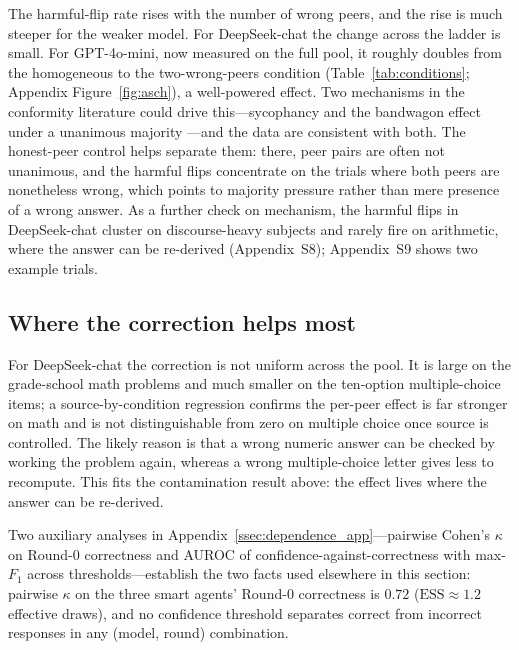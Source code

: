 \documentclass[11pt]{article}
\begin{document}
The harmful-flip rate rises with the number of wrong peers, and the rise is
much steeper for the weaker model.
For DeepSeek-chat the change across the ladder is small.
For GPT-4o-mini, now measured on the full pool, it roughly doubles from the
homogeneous to the two-wrong-peers condition (Table~\ref{tab:conditions};
Appendix Figure~\ref{fig:asch}), a well-powered effect.
Two mechanisms in the conformity literature could drive this---sycophancy
\citep{sharma2023towards} and the bandwagon effect under a unanimous
majority \citep{asch1951effects,koo2024benchmarking}---and the data are
consistent with both.
The honest-peer control helps separate them: there, peer pairs are often
not unanimous, and the harmful flips concentrate on the trials where both
peers are nonetheless wrong, which points to majority pressure rather than
mere presence of a wrong answer.
As a further check on mechanism, the harmful flips in DeepSeek-chat cluster
on discourse-heavy subjects and rarely fire on arithmetic, where the answer
can be re-derived (Appendix~S8); Appendix~S9 shows two example trials.


\subsection{Where the correction helps most}
\label{sub:crossmodel}

For DeepSeek-chat the correction is not uniform across the pool.
It is large on the grade-school math problems and much smaller on the
ten-option multiple-choice items; a source-by-condition regression confirms
the per-peer effect is far stronger on math and is not distinguishable from
zero on multiple choice once source is controlled.
The likely reason is that a wrong numeric answer can be checked by working
the problem again, whereas a wrong multiple-choice letter gives less to
recompute.
This fits the contamination result above: the effect lives where the answer
can be re-derived.

Two auxiliary analyses in
Appendix~\ref{ssec:dependence_app}---pairwise Cohen's $\kappa$ on
Round-0 correctness and AUROC of confidence-against-correctness with
max-$F_1$ across thresholds---establish the two facts used elsewhere
in this section: pairwise $\kappa$ on the three smart agents' Round-0
correctness is $0.72$ ($\mathrm{ESS}\approx 1.2$ effective draws), and
no confidence threshold separates correct from incorrect responses in
any (model, round) combination.
\end{document}
